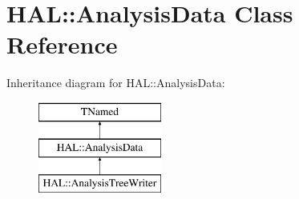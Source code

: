 \hypertarget{class_h_a_l_1_1_analysis_data}{\section{H\-A\-L\-:\-:Analysis\-Data Class Reference}
\label{class_h_a_l_1_1_analysis_data}
}
Inheritance diagram for H\-A\-L\-:\-:Analysis\-Data\-:\begin{figure}[H]
\begin{center}
\leavevmode
\includegraphics[height=3.000000cm]{class_h_a_l_1_1_analysis_data}
\end{center}
\end{figure}
